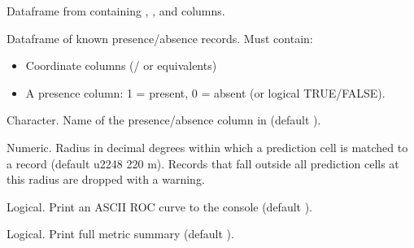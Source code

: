 \documentclass[a4paper]{book}
\begin{document}
\begin{Arguments}
\begin{ldescription}
\item[\code{predicted}] Dataframe from  containing , ,
and  columns.

\item[\code{records}] Dataframe of known presence/absence records. Must contain:
\begin{itemize}

\item{} Coordinate columns (/ or equivalents)
\item{} A presence column: 1 = present, 0 = absent (or logical TRUE/FALSE).

\end{itemize}


\item[\code{presence\_col}] Character. Name of the presence/absence column in
 (default ).

\item[\code{match\_radius\_deg}] Numeric. Radius in decimal degrees within which a
prediction cell is matched to a record (default  \bsl{}u2248 220 m).
Records that fall outside all prediction cells at this radius are dropped
with a warning.

\item[\code{plot}] Logical. Print an ASCII ROC curve to the console (default ).

\item[\code{verbose}] Logical. Print full metric summary (default ).
\end{ldescription}
\end{Arguments}
%
\end{document}
